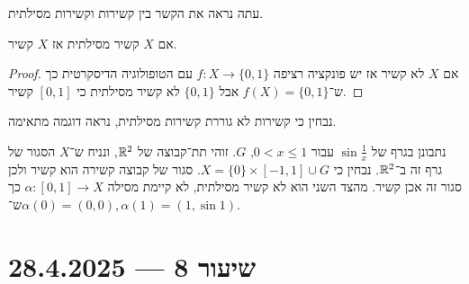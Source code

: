 עתה נראה את הקשר בין קשירות וקשירות מסילתית.
\begin{proposition}
	אם $X$ קשיר מסילתית אז $X$ קשיר.
\end{proposition}
\begin{proof}
	אם $X$ לא קשיר אז יש פונקציה רציפה $f : X \to \{0, 1\}$ עם הטופולוגיה הדיסקרטית כך ש־$f(X) = \{0, 1\}$ אבל $\{0, 1\}$ לא קשיר מסילתית כי $[0, 1]$ קשיר.
\end{proof}
נבחין כי קשירות לא גוררת קשירות מסילתית, נראה דוגמה מתאימה.
\begin{example}
	נתבונן בגרף של $\sin \frac{1}{x}$ עבור $0 < x \le 1$, $G$.
	זוהי תת־קבוצה של $\mathbb{R}^2$, ונניח ש־$X$ הסגור של גרף זה ב־$\mathbb{R}^2$.
	נבחין כי $X = \{0\} \times [-1, 1] \cup G$.
	סגור של קבוצה קשירה הוא קשיר ולכן סגור זה אכן קשיר.
	מהצד השני הוא לא קשיר מסילתית, לא קיימת מסילה $\alpha : [0, 1] \to X$ כך ש־$\alpha(0) = (0, 0), \alpha(1) = (1, \sin 1)$.
\end{example}

\section{שיעור 8 --- 28.4.2025}

